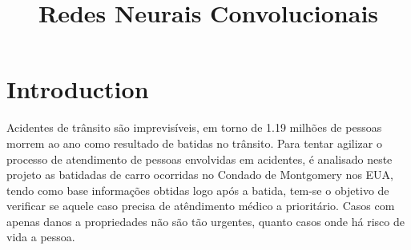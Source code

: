 \documentclass[conference]{IEEEtran}
\begin{document}
\title{Redes Neurais Convolucionais}

\author{
\and
{}
\and
{}
\and
{}
}

\maketitle



    




\section{Introduction}
Acidentes de trânsito são imprevisíveis, em torno de 1.19 milhões de pessoas morrem ao ano como resultado
de batidas no trânsito\cite{b1}. Para tentar agilizar o processo de atendimento de pessoas envolvidas em acidentes, é
analisado neste projeto as batidadas de carro ocorridas no Condado de Montgomery nos EUA, tendo como base informações obtidas logo
após a batida, tem-se o objetivo de verificar se aquele caso precisa de atêndimento médico a prioritário. Casos com apenas danos a propriedades não são tão urgentes, quanto casos 
onde há risco de vida a pessoa. 
\end{document}
